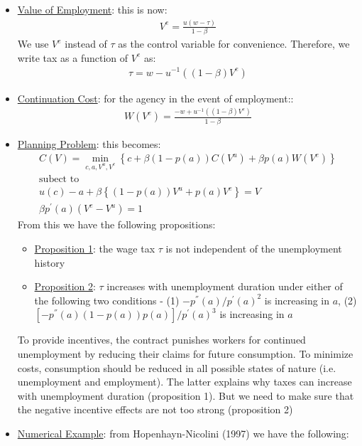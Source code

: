 \documentclass{article}
\begin{document}
\begin{itemize}
    \item  \underline{Value of Employment}: this is now:
    \begin{gather*}
        V^{e} = \frac{u(w - \tau)}{1 - \beta}
    \end{gather*}
    We use $V^{e}$ instead of $\tau$ as the control variable for convenience. Therefore, we write tax as a function of $V^{e}$ as:
    \begin{gather*}
        \tau = w - u^{-1}((1-\beta)V^{e})
    \end{gather*}
    \item  \underline{Continuation Cost}: for the agency in the event of employment::
    \begin{gather*}
        W(V^{e}) = \frac{-w + u^{-1}((1-\beta)V^{e})}{1 - \beta}
    \end{gather*}
    \item  \underline{Planning Problem}: this becomes:
    \begin{gather*}
        C(V) = \min_{c,a,V^{u},V^{e}} \left\{ c + \beta (1- p(a)) C(V^{u}) + \beta p(a)W(V^{e}) \right\} \\
        \text{subect to} \\
        u(c) - a + \beta \left\{ (1 - p(a))V^{u} + p(a)V^{e} \right\} = V \tag{PKC} \\
        \beta p^{'}(a) (V^{e} - V^{u}) = 1 \tag{IC}
    \end{gather*}
    From this we have the following propositions:
    \begin{itemize}
        \item  \underline{Proposition 1}: the wage tax $\tau$ is not independent of the unemployment history
        \item  \underline{Proposition 2}: $\tau$ increases with unemployment duration under either of the following two conditions - (1) $-p^{''}(a)/p^{'}(a)^{2}$ is increasing in $a$, (2) $[-p^{''}(a)(1-p(a))p(a)]/p^{'}(a)^{3}$ is increasing in $a$
    \end{itemize}
    To provide incentives, the contract punishes workers for continued unemployment by reducing their claims for future consumption. To minimize costs, consumption should be reduced in all possible states of nature (i.e. unemployment and employment). The latter explains why taxes can increase with unemployment duration (proposition 1). But we need to make sure that the negative incentive effects are not too strong (proposition 2)
    \item  \underline{Numerical Example}: from Hopenhayn-Nicolini (1997) we have the following:

\end{itemize}
\end{document}
